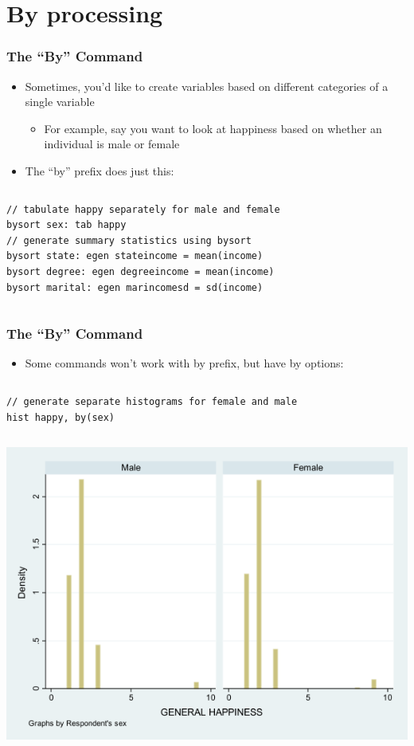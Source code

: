 \documentclass[table]{beamer}
\begin{document}
\section{By processing}
\label{sec-3}
\begin{frame}[fragile]
\frametitle{The ``By'' Command}
\label{sec-3-1}

\begin{itemize}
\item Sometimes, you'd like to create variables based on different categories of a single variable
\begin{itemize}
\item For example, say you want to look at happiness based on whether an individual is male or female
\end{itemize}
\item The ``by'' prefix does just this:
\end{itemize}
\vspace{-.5em} \begin{columns}  \begin{block}{}

\begin{verbatim}
// tabulate happy separately for male and female 
bysort sex: tab happy
// generate summary statistics using bysort 
bysort state: egen stateincome = mean(income)
bysort degree: egen degreeincome = mean(income)
bysort marital: egen marincomesd = sd(income)
\end{verbatim}
\end{block} \end{columns}
\end{frame}
\begin{frame}[fragile]
\frametitle{The ``By'' Command}
\label{sec-3-2}

\begin{itemize}
\item Some commands won't work with by prefix, but have by options:
\end{itemize}
\vspace{-.5em} \begin{columns}  \begin{block}{}

\begin{verbatim}
// generate separate histograms for female and male 
hist happy, by(sex)
\end{verbatim}
\end{block} \end{columns}

\includegraphics[width=.6\textwidth]{images/histBysex.png}
\end{frame}
\end{document}
